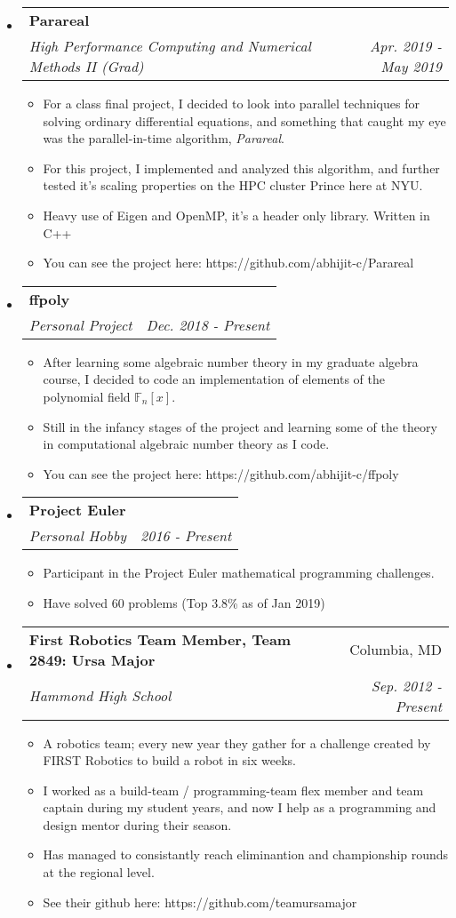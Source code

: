 \documentclass[letterpaper,11pt]{article}
\makeatletter
\newcommand{\resitem}[1]{\item #1 \vspace{-2pt}}
\newcommand{\ressubheading}[4]{
\begin{tabular*}{6.5in}{l@{\cftdotfill{\cftsecdotsep}\extracolsep{\fill}}r}
		\textbf{#1} & #2 \\
		\textit{#3} & \textit{#4} \\
\end{tabular*}\vspace{-6pt}}
\makeatother
\begin{document}
\begin{itemize}
\item
  \ressubheading{Parareal}{}{High Performance Computing and Numerical Methods
  II (Grad)}{Apr. 2019 - May 2019}
	\begin{itemize}
    \resitem{For a class final project, I decided to look into parallel
    techniques for solving ordinary differential equations, and something that
    caught my eye was the parallel-in-time algorithm, \textit{Parareal}.}
    \resitem{For this project, I implemented and analyzed this algorithm, and
    further tested it's scaling properties on the HPC cluster Prince here at
    NYU.}
    \resitem{Heavy use of Eigen and OpenMP, it's a header only library. Written
    in C++}
    \resitem{You can see the project here: https://github.com/abhijit-c/Parareal}
	\end{itemize}

\item
	\ressubheading{ffpoly}{}{Personal Project}{Dec. 2018 - Present}
	\begin{itemize}
		\resitem{After learning some algebraic number theory in my graduate
        algebra course, I decided to code an implementation of elements of the
        polynomial field $\mathbb{F}_n[x]$.}
        \resitem{Still in the infancy stages of the project and learning some of
        the theory in computational algebraic number theory as I code.}
        \resitem{You can see the project here:
        https://github.com/abhijit-c/ffpoly}
	\end{itemize}

\item
	\ressubheading{Project Euler}{}{Personal Hobby}{2016 - Present}
	\begin{itemize}
		\resitem{Participant in the Project Euler mathematical programming
        challenges.}
        \resitem{Have solved 60 problems (Top 3.8\% as of Jan 2019)}
	\end{itemize}

\item
	\ressubheading{First Robotics Team Member, Team 2849: Ursa Major}{Columbia, MD}{Hammond High
    School}{Sep. 2012 - Present}
	\begin{itemize}
		\resitem{A robotics team; every new year they gather for a challenge
        created by FIRST Robotics to build a robot in six weeks.}
        \resitem{I worked as a build-team / programming-team flex member and
        team captain during my student years, and now I help as a programming
        and design mentor during their season.}
        \resitem{Has managed to consistantly reach eliminantion and championship
        rounds at the regional level.}
        \resitem{See their github here: https://github.com/teamursamajor}
	\end{itemize}

\end{itemize}
\end{document}

